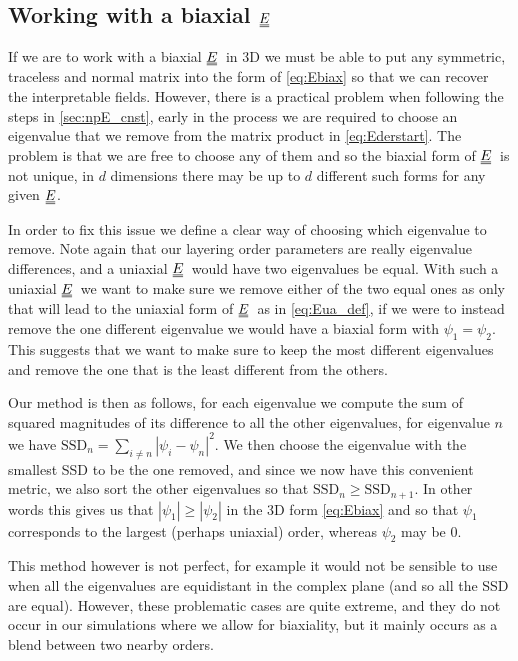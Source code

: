 \documentclass[12pt]{article}
\newcommand{\duf}[2]{\stackunder[0.5pt]{\stackunder[0.8pt]{\stackunder[1pt]{\ensuremath{#1}}{\rule{\widthof{\ensuremath{#2}}*\real{0.9}}{.1ex}}}{\rule{\widthof{\ensuremath{#2}}*\real{0.9}}{.1ex}}}{}}
\newcommand{\du}[1]{\duf{#1}{#1}}
\newcommand{\EE}{\ensuremath{\du{E}}}
\begin{document}
    \subsection{Working with a biaxial \EE}
        If we are to work with a biaxial \EE\ in 3D we must be able to put any symmetric, traceless and normal matrix into the form of \cref{eq:Ebiax} so that we can recover the interpretable fields.
        However, there is a practical problem when following the steps in \cref{sec:npE_cnst}, early in the process we are required to choose an eigenvalue that we remove from the matrix product in \cref{eq:Ederstart}.
        The problem is that we are free to choose any of them and so the biaxial form of \EE\ is not unique, in $d$ dimensions there may be up to $d$ different such forms for any given \EE.

        In order to fix this issue we define a clear way of choosing which eigenvalue to remove.
        Note again that our layering order parameters are really eigenvalue differences, and a uniaxial \EE\ would have two eigenvalues be equal.
        With such a uniaxial \EE\ we want to make sure we remove either of the two equal ones as only that will lead to the uniaxial form of \EE\ as in \cref{eq:Eua_def}, if we were to instead remove the one different eigenvalue we would have a biaxial form with $\psi_1=\psi_2$.
        This suggests that we want to make sure to keep the most different eigenvalues and remove the one that is the least different from the others.

        Our method is then as follows, for each eigenvalue we compute the sum of squared magnitudes of its difference to all the other eigenvalues, for eigenvalue $n$ we have $\text{SSD}_n = \sum_{i \neq n} |\psi_i-\psi_n|^2$.
        We then choose the eigenvalue with the smallest SSD to be the one removed, and since we now have this convenient metric, we also sort the other eigenvalues so that $\text{SSD}_n \geq \text{SSD}_{n+1}$.
        In other words this gives us that $|\psi_1| \geq |\psi_2|$ in the 3D form \cref{eq:Ebiax} and so that $\psi_1$ corresponds to the largest (perhaps uniaxial) order, whereas $\psi_2$ may be 0.

        This method however is not perfect, for example it would not be sensible to use when all the eigenvalues are equidistant in the complex plane (and so all the SSD are equal).
        However, these problematic cases are quite extreme, and they do not occur in our simulations where we allow for biaxiality, but it mainly occurs as a blend between two nearby orders.
\end{document}
